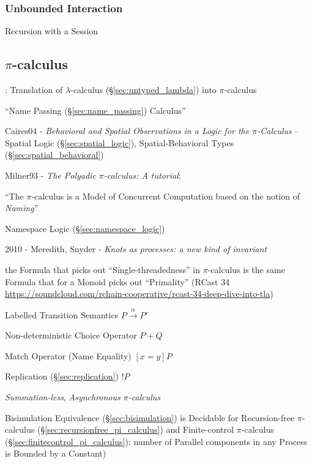 \subsubsection{Unbounded Interaction}\label{sec:unbounded_interaction}

Recursion with a Session



\subsection{$\pi$-calculus}\label{sec:pi_calculus}

\cite{milner-parrow-walker92}

\cite{milner92}: Translation of $\lambda$-calculus
(\S\ref{sec:untyped_lambda}) into $\pi$-calculus

``Name Passing (\S\ref{sec:name_passing}) Calculus''

Caires04 - \emph{Behavioral and Spatial Observations in a Logic for the
  $\pi$-Calculus} -- Spatial Logic (\S\ref{sec:spatial_logic}),
Spatial-Behavioral Types (\S\ref{sec:spatial_behavioral})

Milner93 - \emph{The Polyadic $\pi$-calculus: A tutorial}:

``The $\pi$-calculus is a Model of Concurrent Computation based on the notion of
\emph{Naming}''

\fist Namespace Logic (\S\ref{sec:namespace_logic})

2010 - Meredith, Snyder - \emph{Knots as processes: a new kind of invariant}

the Formula that picks out ``Single-threadedness'' in $\pi$-calculus is the
same Formula that for a Monoid picks out ``Primality'' (RCast 34
\url{https://soundcloud.com/rchain-cooperative/rcast-34-deep-dive-into-tla})

Labelled Transition Semantics $P \xrightarrow{\alpha} P'$

Non-deterministic Choice Operator $P + Q$

Match Operator (Name Equality) $[x=y]P$

Replication (\S\ref{sec:replication}) $!P$

\emph{Summation-less}, \emph{Asynchronous
  $\pi$-calculus} %
\cite{honda-vasconcelos-kubo98}

Bisimulation Equivalence (\S\ref{sec:bisimulation}) is Decidable for
Recursion-free $\pi$-calculus (\S\ref{sec:recursionfree_pi_calculus})
and Finite-control $\pi$-calculus
(\S\ref{sec:finitecontrol_pi_calculus}); number of Parallel components
in any Process is Bounded by a Constant)

